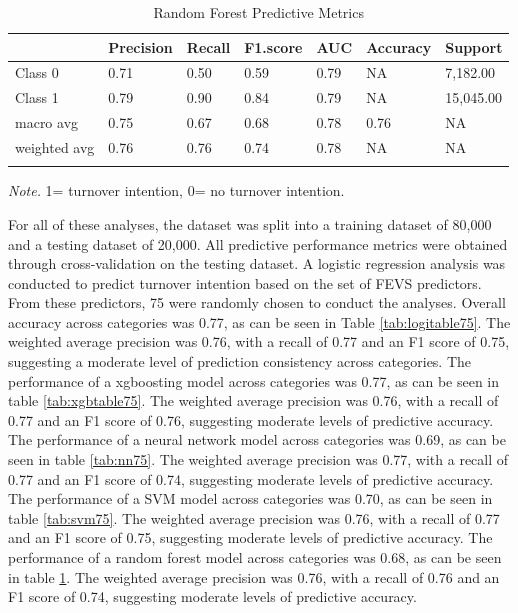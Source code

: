 \documentclass[
  man]{apa7}
\begin{document}
\begin{table}[tbp]

\begin{center}
\begin{threeparttable}

\caption{\label{tab:rf75}Random Forest Predictive Metrics}

\begin{tabular}{lllllll}
\toprule
 & \multicolumn{1}{c}{Precision} & \multicolumn{1}{c}{Recall} & \multicolumn{1}{c}{F1.score} & \multicolumn{1}{c}{AUC} & \multicolumn{1}{c}{Accuracy} & \multicolumn{1}{c}{Support}\\
\midrule
Class 0 & 0.71 & 0.50 & 0.59 & 0.79 & NA & 7,182.00\\
Class 1 & 0.79 & 0.90 & 0.84 & 0.79 & NA & 15,045.00\\
macro avg & 0.75 & 0.67 & 0.68 & 0.78 & 0.76 & NA\\
weighted avg & 0.76 & 0.76 & 0.74 & 0.78 & NA & NA\\
\bottomrule
\addlinespace
\end{tabular}

\begin{tablenotes}[para]
\normalsize{\textit{Note.} 1= turnover intention, 0= no turnover intention.}
\end{tablenotes}

\end{threeparttable}
\end{center}

\end{table}

For all of these analyses, the dataset was split into a training dataset of 80,000 and a testing dataset of 20,000. All predictive performance metrics were obtained through cross-validation on the testing dataset. A logistic regression analysis was conducted to predict turnover intention based on the set of FEVS predictors. From these predictors, 75 were randomly chosen to conduct the analyses. Overall accuracy across categories was 0.77, as can be seen in Table \ref{tab:logitable75}. The weighted average precision was 0.76, with a recall of 0.77 and an F1 score of 0.75, suggesting a moderate level of prediction consistency across categories.
The performance of a xgboosting model across categories was 0.77, as can be seen in table \ref{tab:xgbtable75}. The weighted average precision was 0.76, with a recall of 0.77 and an F1 score of 0.76, suggesting moderate levels of predictive accuracy.
The performance of a neural network model across categories was 0.69, as can be seen in table \ref{tab:nn75}. The weighted average precision was 0.77, with a recall of 0.77 and an F1 score of 0.74, suggesting moderate levels of predictive accuracy.
The performance of a SVM model across categories was 0.70, as can be seen in table \ref{tab:svm75}. The weighted average precision was 0.76, with a recall of 0.77 and an F1 score of 0.75, suggesting moderate levels of predictive accuracy.
The performance of a random forest model across categories was 0.68, as can be seen in table \ref{tab:rf75}. The weighted average precision was 0.76, with a recall of 0.76 and an F1 score of 0.74, suggesting moderate levels of predictive accuracy.
\end{document}
